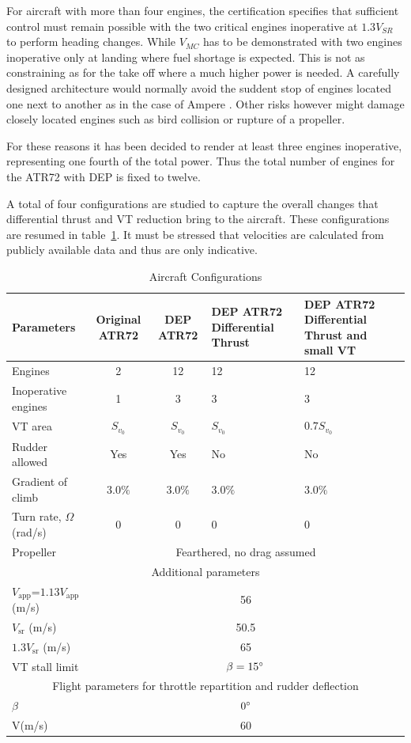For aircraft with more than four engines, the certification specifies that sufficient control must remain possible with the two critical engines inoperative at $1.3V_{SR}$ to perform heading changes. While $V_{MC}$ has to be demonstrated with two engines inoperative only at landing where fuel shortage is expected. This is not as constraining as for the take off where a much higher power is needed. A carefully designed architecture would normally avoid the suddent stop of engines located one next to another as in the case of Ampere \cite{Ampere_concept}. Other risks however might damage closely located engines such as bird collision or rupture of a propeller.

For these reasons it has been decided to render at least three engines inoperative, representing one fourth of the total power. Thus the total number of engines for the ATR72 with DEP is fixed to twelve.

A total of four configurations are studied to capture the overall changes that differential thrust and VT reduction bring to the aircraft. These configurations are resumed in table~\ref{tab:ConfigurationStudied}. It must be stressed that velocities are calculated from publicly available data and thus are only indicative.


\begin{table}[hbt]
	\caption{\label{tab:ConfigurationStudied} Aircraft Configurations}
	\centering
	\begin{tabular}{l|c|c|m{3cm}|m{3cm}}
		Parameters & Original ATR72 & DEP ATR72 & DEP ATR72 Differential Thrust & DEP ATR72 Differential Thrust and small VT\\
		\hline
		Engines & 2 & 12 & 12 & 12\\
		Inoperative engines & 1 & 3 & 3 & 3\\
		VT area & $S_{v_0}$ & $S_{v_0}$ & $S_{v_0}$ & $0.7 S_{v_0}$\\
		Rudder allowed & Yes & Yes & No & No\\
		Gradient of climb & $3.0\%$ &$3.0\%$ & $3.0\%$ & $3.0\%$\\
		Turn rate, $\Omega$ (rad/s)& 0 & 0& 0&0\\
		Propeller & \multicolumn{4}{c}{Fearthered, no drag assumed}\\
		\hline
		\multicolumn{5}{c}{Additional parameters} \\
		\hline
		$V_{\textrm{app}}$=$1.13V_{\textrm{app}}$ (m/s)& \multicolumn{4}{c}{56}\\
		$V_{\textrm{sr}}$ (m/s)& \multicolumn{4}{c}{50.5}\\
		$1.3V_{\textrm{sr}}$ (m/s)& \multicolumn{4}{c}{65}\\
		VT stall limit & \multicolumn{4}{c}{$\beta=15\degree$}\\
		\hline
		\multicolumn{5}{c}{Flight parameters for throttle repartition and rudder deflection}\\
		\hline
		$\beta$ & \multicolumn{4}{c}{$0\degree$}\\
		V(m/s) & \multicolumn{4}{c}{60}\\
	\end{tabular}
\end{table}

